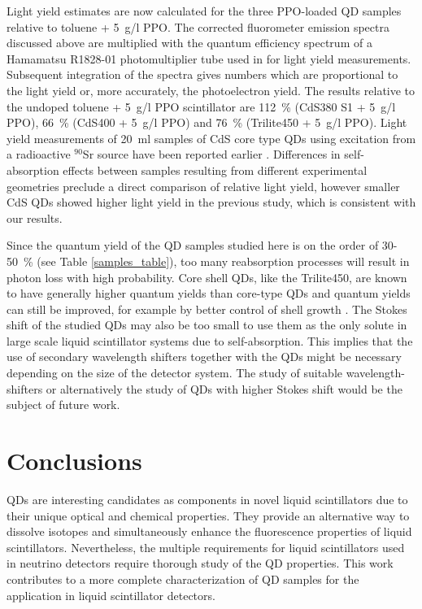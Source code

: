 \documentclass[cits]{JINST}
\begin{document}
Light yield estimates are now calculated for the three PPO-loaded QD samples relative to toluene + 5~g/l PPO. The corrected fluorometer emission spectra discussed above are multiplied with the quantum efficiency spectrum of a Hamamatsu R1828-01 photomultiplier tube used in \cite{mitpaper} for light yield measurements. Subsequent integration of the spectra gives numbers which are proportional to the light yield or, more accurately, the photoelectron yield. The results relative to the undoped toluene + 5~g/l PPO scintillator are 112~\% (CdS380 S1 + 5~g/l PPO), 66~\% (CdS400 + 5~g/l PPO) and 76~\% (Trilite450 + 5~g/l PPO). Light yield measurements of 20~ml samples of CdS core type QDs using excitation from a radioactive $^{90}$Sr source have been reported earlier \cite{mitpaper}. Differences in self-absorption effects between samples resulting from different experimental geometries preclude a direct comparison of relative light yield, however smaller CdS QDs showed higher light yield in the previous study, which is consistent with our results. 
  
Since the quantum yield of the QD samples studied here is on the order of 30-50~\% (see Table \ref{samples_table}), too many reabsorption processes will result in photon loss with high probability. Core shell QDs, like the Trilite450, are known to have generally higher quantum yields than core-type QDs \cite{swafford2006,dabbousi1997,obrien2011} and quantum yields can still be improved, for example by better control of shell growth \cite{mcbride2006}. The Stokes shift of the studied QDs may also be too small to use them as the only solute in large scale liquid scintillator systems due to self-absorption. This implies that the use of secondary wavelength shifters together with the QDs might be necessary depending on the size of the detector system. The study of suitable wavelength-shifters or alternatively the study of QDs with higher Stokes shift would be the subject of future work. 

\section{Conclusions}

QDs are interesting candidates as components in novel liquid scintillators due to their unique optical and chemical properties. They provide an alternative way to dissolve isotopes and simultaneously enhance the fluorescence properties of liquid scintillators. Nevertheless, the multiple requirements for liquid scintillators used in neutrino detectors require thorough study of the QD properties. This work contributes to a more complete characterization of QD samples for the application in liquid scintillator detectors. 
\end{document}

